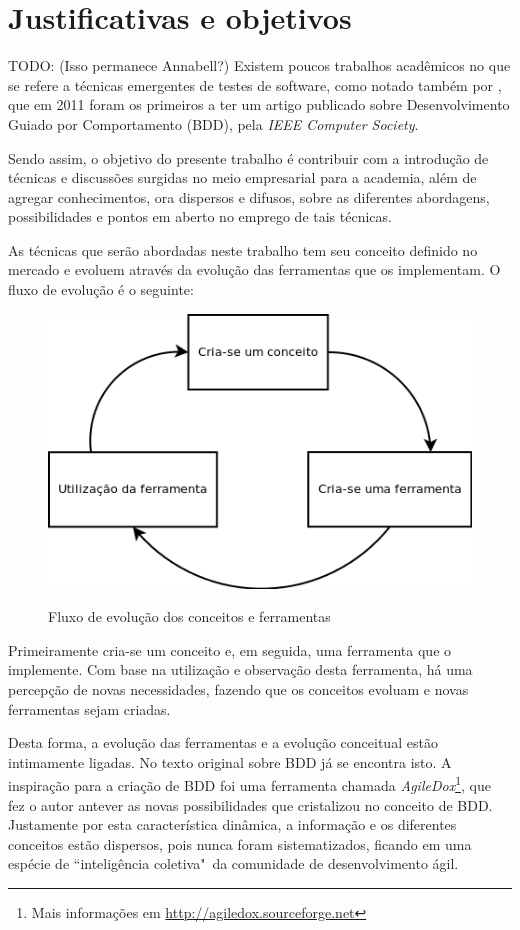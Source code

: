 \section{Justificativas e objetivos}

TODO: (Isso permanece Annabell?) Existem poucos trabalhos acadêmicos no que se refere a técnicas emergentes de testes de software, como notado também por , que em 2011 foram os primeiros a ter um artigo publicado sobre Desenvolvimento Guiado por Comportamento (BDD), pela \textit{IEEE Computer Society}.

Sendo assim, o objetivo do presente trabalho é contribuir com a introdução de técnicas e discussões surgidas no meio empresarial para a academia, além de agregar conhecimentos, ora dispersos e difusos, sobre as diferentes abordagens, possibilidades e pontos em aberto no emprego de tais técnicas.

As técnicas que serão abordadas neste trabalho tem seu conceito definido no mercado e evoluem através da evolução das ferramentas que os implementam. O fluxo de evolução é o seguinte:

\begin{figure}[h]
  \center
  \caption{Fluxo de evolução dos conceitos e ferramentas}
  \includegraphics[scale=0.60]{images/fluxo-conceito-ferramenta}
  \label{img:fluxo_conceito_ferramenta}
\end{figure}

Primeiramente cria-se um conceito e, em seguida, uma ferramenta que o implemente. Com base na utilização e observação desta ferramenta, há uma percepção de novas necessidades, fazendo que os conceitos evoluam e novas ferramentas sejam criadas.

Desta forma, a evolução das ferramentas e a evolução conceitual estão intimamente ligadas. No texto original sobre BDD \cite{IntroducingBDD} já se encontra isto. A inspiração para a criação de BDD foi uma ferramenta chamada \textit{AgileDox}\footnote{Mais informações em \url{http://agiledox.sourceforge.net}}, que fez o autor antever as novas possibilidades que cristalizou no conceito de BDD. Justamente por esta característica dinâmica, a informação e os diferentes conceitos estão dispersos, pois nunca foram sistematizados, ficando em uma espécie de ``inteligência coletiva"\ da comunidade de desenvolvimento ágil.

